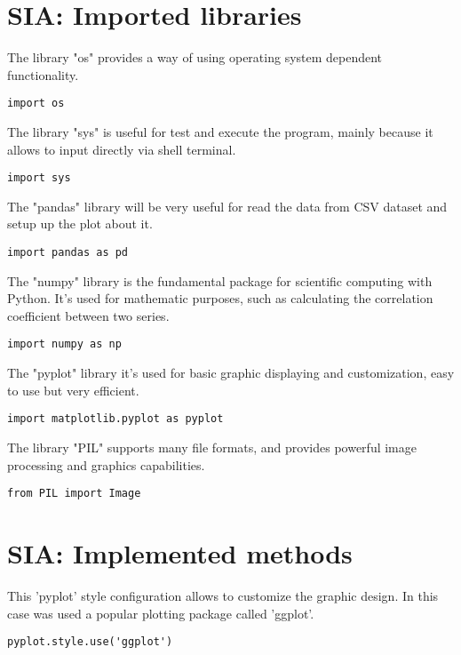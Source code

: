 


\label{SIA_Implementation}

\section{SIA: Imported libraries}
\label{SIA_libraries}
The library "os" provides a way of using operating system dependent functionality.
\begin{lstlisting}
import os
\end{lstlisting}

The library "sys" is useful for test and execute the program, mainly because it allows to input directly via shell terminal.
\begin{lstlisting}
import sys
\end{lstlisting}

The "pandas" library will be very useful for read the data from CSV dataset and setup up the plot about it.
\begin{lstlisting}
import pandas as pd
\end{lstlisting}

The "numpy" library is the fundamental package for scientific computing with Python. It's used for mathematic purposes, such as calculating the correlation coefficient between two series.
\begin{lstlisting}
import numpy as np
\end{lstlisting}
 
The "pyplot" library it's used for basic graphic displaying and customization, easy to use but very efficient.
\begin{lstlisting}
import matplotlib.pyplot as pyplot
\end{lstlisting}

The library "PIL" supports many file formats, and provides powerful image processing and graphics capabilities.
\begin{lstlisting}
from PIL import Image
\end{lstlisting}

\section{SIA: Implemented methods}
This 'pyplot' style configuration allows to customize the graphic design. In this case was used a popular plotting package called 'ggplot'.
\begin{lstlisting}
pyplot.style.use('ggplot')
\end{lstlisting}

